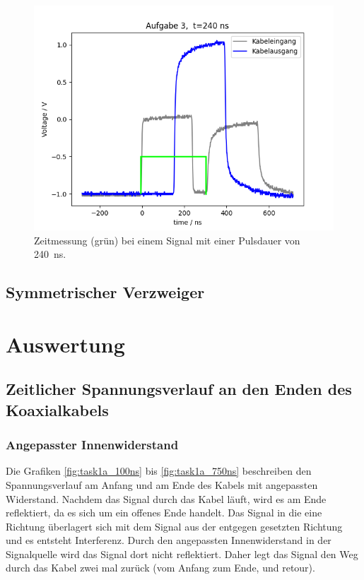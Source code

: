 \documentclass{article}
\begin{document}
\begin{figure}[H]
\centering
\caption{Zeitmessung (grün) bei einem Signal mit einer Pulsdauer von 240~ns.}
\label{fig:task3_240ns}
\includegraphics[scale=0.6]{bilder/task3/task3_240ns.png}
\end{figure}


\subsection{Symmetrischer Verzweiger}


\section{Auswertung}

\subsection{Zeitlicher Spannungsverlauf an den Enden des Koaxialkabels}

\subsubsection{Angepasster Innenwiderstand}
Die Grafiken \ref{fig:task1a_100ns} bis \ref{fig:task1a_750ns} beschreiben den Spannungsverlauf am Anfang und am Ende des Kabels mit angepassten Widerstand. Nachdem das Signal durch das Kabel läuft, wird es am Ende reflektiert, da es sich um ein offenes Ende handelt. Das Signal in die eine Richtung überlagert sich mit dem Signal aus der entgegen gesetzten Richtung und es entsteht Interferenz. Durch den angepassten Innenwiderstand in der Signalquelle wird das Signal dort nicht reflektiert. Daher legt das Signal den Weg durch das Kabel zwei mal zurück (vom Anfang zum Ende, und retour).
\end{document}

